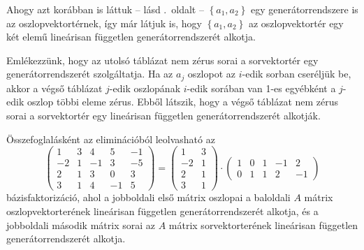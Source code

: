 \documentclass[9pt, a4paper, showtrims]{memoir}
\theoremstyle{plain}
\theoremstyle{remark}
\theoremstyle{definition}
\begin{document}
Ahogy azt korábban is láttuk -- lásd .~oldalt -- $\left\{ a_1,a_2 \right\}$ egy generátorrendszere is az oszlopvektortérnek, így már látjuk is, hogy $\left\{ a_1,a_2 \right\}$
az oszlopvektortér egy két elemű lineárisan független generátorrendszerét alkotja.

Emlékezzünk, hogy az utolsó táblázat nem zérus sorai a sorvektortér egy generátorrendszerét szolgáltatja. 
Ha az $a_j$ oszlopot az $i$-edik sorban cseréljük be, akkor a végső táblázat $j$-edik oszlopának $i$-edik sorában van 1-es egyébként a $j$-edik oszlop többi eleme zérus.
Ebből látszik, hogy a végső táblázat nem zérus sorai a sorvektortér egy lineárisan független generátorrendszerét alkotják.

Összefoglalásként az eliminációból leolvasható az
\[
	\begin{pmatrix}
		1  & 3 & 4  & 5  & -1 \\
		-2 & 1 & -1 & 3  & -5 \\
		2  & 1 & 3  & 0  & 3  \\
		3  & 1 & 4  & -1 & 5
	\end{pmatrix}
	=
	\begin{pmatrix}
		1  & 3 \\
		-2 & 1 \\
		2  & 1 \\
		3  & 1
	\end{pmatrix}
	\cdot
	\begin{pmatrix}
		1 & 0 & 1 & -1 & 2  \\
		0 & 1 & 1 & 2  & -1
	\end{pmatrix}
\]
bázisfaktorizáció, ahol a jobboldali első mátrix oszlopai a baloldali $A$ mátrix oszlopvektorterének lineárisan független generátorrendszerét alkotja, 
és a jobboldali második mátrix sorai az $A$ mátrix sorvektorterének lineárisan független generátorrendszerét alkotja.
\end{document}
